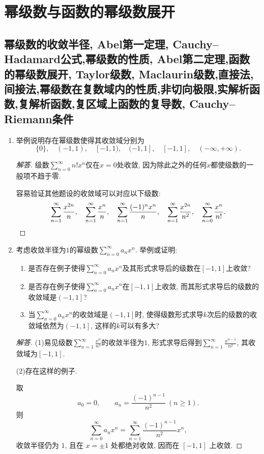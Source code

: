 \section{幂级数与函数的幂级数展开}
\subsection{幂级数的收敛半径, Abel第一定理, Cauchy--Hadamard公式,幂级数的性质, Abel第二定理,函数的幂级数展开, Taylor级数, Maclaurin级数,直接法,间接法,幂级数在复数域内的性质,非切向极限,实解析函数,复解析函数,复区域上函数的复导数, Cauchy--Riemann条件}
\begin{quiza}
\begin{enumerate}
\item 举例说明存在幂级数使得其收敛域分别为
\[\{0\},\quad(-1,1),\quad[-1,1),\quad(-1,1],\quad[-1,1],\quad(-\infty,+\infty).\]
\begin{proof}[解答]
级数\(\sum_{n=0}^{\infty}n!x^n\)仅在\(x=0\)处收敛, 
因为除此之外的任何\(x\)都使级数的一般项不趋于零.

容易验证其他题设的收敛域可以对应以下级数:
\[\sum_{n=1}^{\infty}\frac{x^{2n}}{n},\quad
\sum_{n=1}^{\infty}\frac{x^{n}}{n},\quad
\sum_{n=1}^{\infty}\frac{(-1)^nx^{n}}{n},\quad
\sum_{n=1}^{\infty}\frac{x^{2n}}{n^2},\quad
\sum_{n=0}^{\infty}\frac{x^{n}}{n!}.\qedhere\]
\end{proof}
\item 考虑收敛半径为\(1\)的幂级数\(\sum_{n=0}^{\infty}a_nx^n\). 
举例或证明:\begin{enumerate}[label=(\arabic*)]
\item 是否存在例子使得\(\sum_{n=0}^{\infty}a_nx^n\)及其形式求导后的级数在\([-1,1]\)上收敛?
\item 是否存在例子使得\(\sum_{n=0}^{\infty}a_nx^n\)在\([-1,1]\)上收敛, 
而其形式求导后的级数的收敛域是\(\left(-1,1\right]\)?
\item 当\(\sum_{n=0}^{\infty}a_nx^n\)的收敛域是\(\left(-1,1\right]\)时, 
使得级数形式求导\(k\)次后的级数的收敛域依然为\(\left(-1,1\right]\), 这样的\(k\)可以有多大?
\end{enumerate}
\begin{proof}[解答]
(1)易见级数\(\sum_{n=1}^{\infty}\frac{x^n}{n^3}\)的收敛半径为\(1\), 
形式求导后得到\(\sum_{n=1}^{\infty}\frac{x^{n-1}}{n^2}\), 其收敛域为\([-1,1]\).

(2)存在这样的例子.

取
\[
a_0=0,\qquad a_n=\frac{(-1)^{n-1}}{n^2}\ (n\ge 1).
\]
则
\[
\sum_{n=0}^{\infty}a_nx^n=\sum_{n=1}^{\infty}\frac{(-1)^{n-1}}{n^2}x^n,
\]
收敛半径仍为 \(1\), 且在 \(x=\pm1\) 处都绝对收敛, 因而在 \([-1,1]\) 上收敛.


\end{proof}
\end{enumerate}
\end{quiza}
